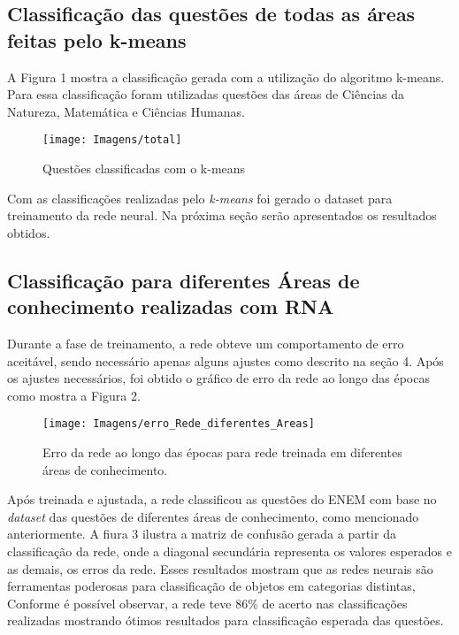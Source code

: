 \documentclass[article,	12pt,	oneside, a4paper,	english, brazil, sumario=tradicional, section=TITLE]{abntex2}
\begin{document}
\subsection{Classificação das questões de todas as áreas feitas pelo k-means}

A Figura 1 mostra a classificação gerada com a utilização do algoritmo k-means. Para essa classificação foram utilizadas questões das áreas de Ciências da Natureza, Matemática e Ciências Humanas.

\begin{figure}[h]
\caption{Questões classificadas com o k-means}\label{fig3}\vspace{-0.5cm}
\begin{center}
\texttt{[image: Imagens/total]}\par
{}%
\end{center}
\end{figure}

Com as classificações realizadas pelo \textit{k-means} foi gerado o dataset para treinamento da rede neural. Na próxima seção serão apresentados os resultados obtidos.

\subsection{Classificação para diferentes Áreas de conhecimento realizadas com RNA}
Durante a fase de treinamento, a rede obteve um comportamento de erro aceitável, sendo necessário apenas alguns ajustes como descrito na seção 4. Após os ajustes necessários, foi obtido o gráfico de erro da rede ao longo das épocas como mostra a Figura 2.

\begin{figure}[h]
\caption{Erro da rede ao longo das épocas para rede treinada em diferentes áreas de conhecimento.}\label{fig2}\vspace{-0.5cm}
\begin{center}
\texttt{[image: Imagens/erro\_Rede\_diferentes\_Areas]}\par
{}%
\end{center}
\end{figure}

Após treinada e ajustada, a rede classificou as questões do ENEM com base no \textit{dataset} das questões de diferentes áreas de conhecimento, como mencionado anteriormente. A fiura 3 ilustra a matriz de confusão gerada a partir da classificação da rede, onde a diagonal secundária representa os valores esperados e as demais, os erros da rede. Esses resultados mostram que as redes neurais são ferramentas poderosas para classificação de objetos em categorias distintas, Conforme é possível observar, a rede teve 86\% de acerto nas classificações realizadas mostrando ótimos resultados para classificação esperada das questões. 
\end{document}
